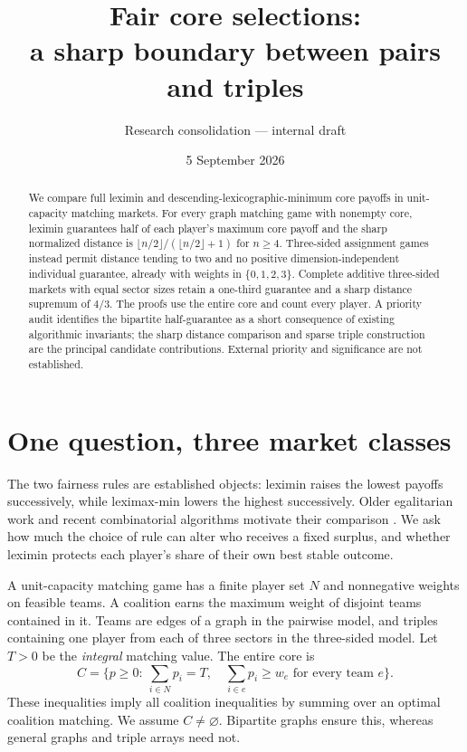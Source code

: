 \documentclass[11pt]{article}
\title{Fair core selections:\\a sharp boundary between pairs and triples}
\author{Research consolidation --- internal draft}
\date{5 September 2026}
\begin{document}
\maketitle
\begin{abstract}
We compare full leximin and descending-lexicographic-minimum core payoffs
in unit-capacity matching markets. For every graph matching game with nonempty
core, leximin guarantees half of each player's maximum core payoff and the
sharp normalized distance is $\lfloor n/2\rfloor/(\lfloor n/2\rfloor+1)$ for
$n\ge4$. Three-sided assignment games instead permit distance tending to two
and no positive dimension-independent individual guarantee, already with
weights in $\{0,1,2,3\}$. Complete additive three-sided markets with equal sector sizes retain
a one-third guarantee and a sharp distance supremum of $4/3$.
The proofs use the entire core and count every player. A priority audit
identifies the bipartite half-guarantee as a short consequence of existing
algorithmic invariants; the sharp distance comparison and sparse triple
construction are the principal candidate contributions. External priority
and significance are not established.
\end{abstract}

\section{One question, three market classes}
The two fairness rules are established objects: leximin raises the lowest
payoffs successively, while leximax-min lowers the highest successively.
Older egalitarian work and recent combinatorial algorithms motivate their
comparison \cite{klijn,vazirani}. We ask how much the choice of rule can alter
who receives a fixed surplus, and whether leximin protects each player's
share of their own best stable outcome.

A unit-capacity matching game has a finite player set $N$ and nonnegative
weights on feasible teams. A coalition earns the maximum weight of disjoint
teams contained in it. Teams are edges of a graph in the pairwise model, and
triples containing one player from each of three sectors in the three-sided
model. Let $T>0$ be the \emph{integral} matching value. The entire core is
\begin{equation}\label{eq:core}
 C=\{p\ge0:\ \textstyle\sum_{i\in N}p_i=T,\quad
                    \sum_{i\in e}p_i\ge w_e\text{ for every team }e\}.
\end{equation}
These inequalities imply all coalition inequalities by summing over an
optimal coalition matching. We assume $C\ne\varnothing$. Bipartite graphs
ensure this, whereas general graphs and triple arrays need not.
\end{document}

